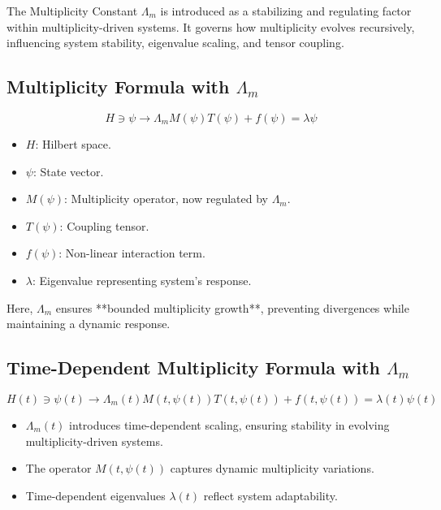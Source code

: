 \documentclass{article}
\theoremstyle{plain}
\begin{document}
The Multiplicity Constant \( \Lambda_m \) is introduced as a stabilizing and regulating factor within multiplicity-driven systems. It governs how multiplicity evolves recursively, influencing system stability, eigenvalue scaling, and tensor coupling.

\subsection{Multiplicity Formula with \( \Lambda_m \)}

\begin{equation}
H \ni \psi \to \Lambda_m M(\psi) T(\psi) + f(\psi) = \lambda \psi
\end{equation}

\begin{itemize}
    \item \( H \): Hilbert space.
    \item \( \psi \): State vector.
    \item \( M(\psi) \): Multiplicity operator, now regulated by \( \Lambda_m \).
    \item \( T(\psi) \): Coupling tensor.
    \item \( f(\psi) \): Non-linear interaction term.
    \item \( \lambda \): Eigenvalue representing system's response.
\end{itemize}

Here, \( \Lambda_m \) ensures **bounded multiplicity growth**, preventing divergences while maintaining a dynamic response.

\subsection{Time-Dependent Multiplicity Formula with \( \Lambda_m \)}

\begin{equation}
H(t) \ni \psi(t) \to \Lambda_m(t) M(t, \psi(t))T(t, \psi(t)) + f(t, \psi(t)) = \lambda(t) \psi(t)
\end{equation}

\begin{itemize}
    \item \( \Lambda_m(t) \) introduces time-dependent scaling, ensuring stability in evolving multiplicity-driven systems.
    \item The operator \( M(t, \psi(t)) \) captures dynamic multiplicity variations.
    \item Time-dependent eigenvalues \( \lambda(t) \) reflect system adaptability.
\end{itemize}
\end{document}
